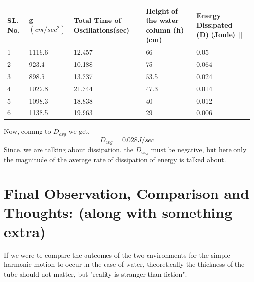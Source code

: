 \documentclass[twocolumn,11pt]{article}
\begin{document}
\begin{center}
\begin{tabular}{||p{0.5cm} | p{1cm}| p{1.5cm}| p{1.3cm} | p{2cm}||} 
 \hline
    SL. No. & g $(cm/sec^2)$ & Total Time of Oscillations(sec) & Height of the water column (h)(cm) & Energy Dissipated (D) (Joule) ||\\ [0.5ex] 
 \hline\hline
 1 & 1119.6 & 12.457 & 66 & 0.05\\ 
 \hline
 2 & 923.4 & 10.188 & 75 & 0.064 \\
 \hline
 3 & 898.6 & 13.337 & 53.5 & 0.024\\
 \hline
 4 & 1022.8 & 21.344 & 47.3 & 0.014\\
 \hline
 5 & 1098.3 & 18.838 & 40 & 0.012\\
 \hline
 6 & 1138.5 & 19.963 & 29 & 0.006\\
 \hline

 \hline
 \hline
\end{tabular}
\end{center}

Now, coming to $D_{avg}$ we get,
\begin{equation}
    \label{avg. rate of energy diddipation for thin tube}
    D_{avg} = 0.028 J/sec
\end{equation}
Since, we are talking about dissipation, the $D_{avg}$ must be negative, but here only the magnitude of the average rate of dissipation of energy is talked about. 

\section{Final Observation, Comparison and Thoughts: (along with something extra)}
If we were to compare the outcomes of the two environments for the simple harmonic motion to occur in the case of water, theoretically the thickness of the tube should not matter, but "reality is stranger than fiction".
\end{document}
